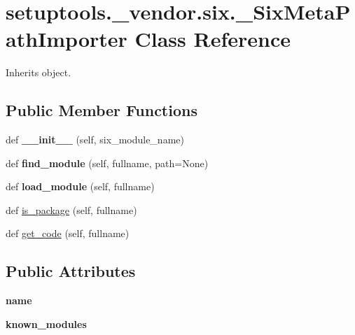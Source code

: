 \hypertarget{classsetuptools_1_1__vendor_1_1six_1_1___six_meta_path_importer}{}\section{setuptools.\+\_\+vendor.\+six.\+\_\+\+Six\+Meta\+Path\+Importer Class Reference}
\label{classsetuptools_1_1__vendor_1_1six_1_1___six_meta_path_importer}


Inherits object.

\subsection*{Public Member Functions}
\begin{DoxyCompactItemize}
\item 
\mbox{\label{classsetuptools_1_1__vendor_1_1six_1_1___six_meta_path_importer_a2bce7855719ca3ccdb8e2ca3288d4e5f}} 
def {\bfseries \+\_\+\+\_\+init\+\_\+\+\_\+} (self, six\+\_\+module\+\_\+name)
\item 
\mbox{\label{classsetuptools_1_1__vendor_1_1six_1_1___six_meta_path_importer_ace26f2a7ab2e224adbd49d3ed87adf71}} 
def {\bfseries find\+\_\+module} (self, fullname, path=None)
\item 
\mbox{\label{classsetuptools_1_1__vendor_1_1six_1_1___six_meta_path_importer_a2acb5dfe3628dec550bdd65ae13c6fc6}} 
def {\bfseries load\+\_\+module} (self, fullname)
\item 
def \hyperlink{classsetuptools_1_1__vendor_1_1six_1_1___six_meta_path_importer_ad711f81f0155bb835c9b80d4ace66ea9}{is\+\_\+package} (self, fullname)
\item 
def \hyperlink{classsetuptools_1_1__vendor_1_1six_1_1___six_meta_path_importer_a5cca91335317b65911692bc4dc5a9e48}{get\+\_\+code} (self, fullname)
\end{DoxyCompactItemize}
\subsection*{Public Attributes}
\begin{DoxyCompactItemize}
\item 
\mbox{\label{classsetuptools_1_1__vendor_1_1six_1_1___six_meta_path_importer_a5ae957dc56d36ce08929ebfd02017a4d}} 
{\bfseries name}
\item 
\mbox{\label{classsetuptools_1_1__vendor_1_1six_1_1___six_meta_path_importer_a0629b239172bb3e1dc2facdf17e1ee73}} 
{\bfseries known\+\_\+modules}
\end{DoxyCompactItemize}
